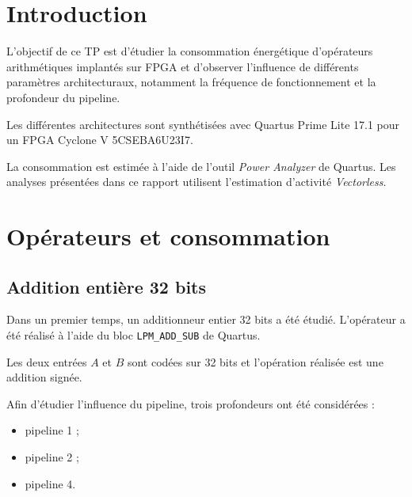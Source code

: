 \documentclass[12pt,a4paper]{article}
\begin{document}
\section{Introduction}

L'objectif de ce TP est d'étudier la consommation énergétique
d'opérateurs arithmétiques implantés sur FPGA et d'observer
l'influence de différents paramètres architecturaux, notamment
la fréquence de fonctionnement et la profondeur du pipeline.

Les différentes architectures sont synthétisées avec Quartus Prime
Lite 17.1 pour un FPGA Cyclone V 5CSEBA6U23I7.

La consommation est estimée à l'aide de l'outil
\textit{Power Analyzer} de Quartus. Les analyses présentées dans
ce rapport utilisent l'estimation d'activité \textit{Vectorless}.



\section{Opérateurs et consommation}



\subsection{Addition entière 32 bits}

Dans un premier temps, un additionneur entier 32 bits a été étudié.
L'opérateur a été réalisé à l'aide du bloc
\texttt{LPM\_ADD\_SUB} de Quartus.

Les deux entrées $A$ et $B$ sont codées sur 32 bits et
l'opération réalisée est une addition signée.

Afin d'étudier l'influence du pipeline, trois profondeurs ont été
considérées :

\begin{itemize}
    \item pipeline 1 ;
    \item pipeline 2 ;
    \item pipeline 4.
\end{itemize}


\end{document}
